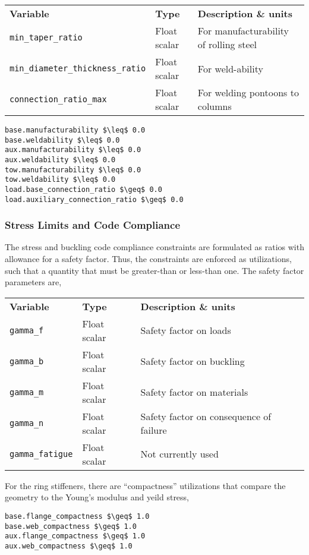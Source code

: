 {\footnotesize
  \begin{tabularx}{\linewidth}{ l l X }
    \textbf{Variable} & \textbf{Type} & \textbf{Description \& units} \\
    \texttt{min\_taper\_ratio} & Float scalar & For manufacturability of rolling steel\\
    \texttt{min\_diameter\_thickness\_ratio} & Float scalar & For weld-ability\\
    \texttt{connection\_ratio\_max} & Float scalar & For welding pontoons to columns\\
  \end{tabularx}
}
\begin{lstlisting}
base.manufacturability $\leq$ 0.0
base.weldability $\leq$ 0.0
aux.manufacturability $\leq$ 0.0
aux.weldability $\leq$ 0.0
tow.manufacturability $\leq$ 0.0
tow.weldability $\leq$ 0.0
load.base_connection_ratio $\geq$ 0.0
load.auxiliary_connection_ratio $\geq$ 0.0
\end{lstlisting}

\subsubsection{Stress Limits and Code Compliance}
The stress and buckling code compliance constraints are formulated as
ratios with allowance for a safety factor.  Thus, the constraints are
enforced as utilizations, such that a quantity that must be greater-than
or less-than one.  The safety factor parameters are,

{\footnotesize
  \begin{tabularx}{\linewidth}{ l l X }
    \textbf{Variable} & \textbf{Type} & \textbf{Description \& units} \\
    \texttt{gamma\_f} & Float scalar & Safety factor on loads\\
    \texttt{gamma\_b} & Float scalar & Safety factor on buckling\\
    \texttt{gamma\_m} & Float scalar & Safety factor on materials\\
    \texttt{gamma\_n} & Float scalar & Safety factor on consequence of failure\\
    \texttt{gamma\_fatigue} & Float scalar & Not currently used\\
  \end{tabularx}
}

For the ring stiffeners, there are ``compactness'' utilizations that
compare the geometry to the Young's modulus and yeild stress,
\begin{lstlisting}
base.flange_compactness $\geq$ 1.0
base.web_compactness $\geq$ 1.0
aux.flange_compactness $\geq$ 1.0
aux.web_compactness $\geq$ 1.0
\end{lstlisting}

